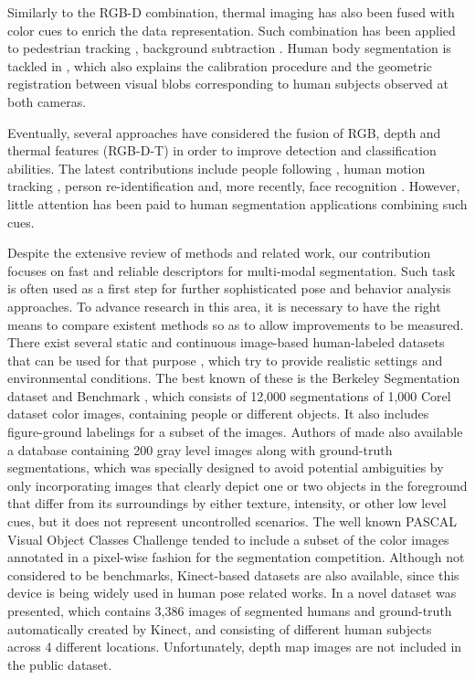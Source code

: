 \documentclass[10pt,twocolumn,letterpaper]{article}
\begin{document}
Similarly to the RGB-D combination, thermal imaging has also been fused with color cues to enrich the data representation. Such combination has been applied to pedestrian tracking \cite{leykin2006robust, leykin2007thermal}, background subtraction \cite{davis2007background}. Human body segmentation is tackled in \cite{zhao2012human}, which also explains the calibration procedure and the geometric registration between visual blobs corresponding to human subjects observed at both cameras. 

Eventually, several approaches have considered the fusion of RGB, depth and thermal features (RGB-D-T) in order to improve detection and classification abilities. The latest contributions include people following \cite{susperregi2013rgb}, human motion tracking \cite{chun2013applications}, person re-identification \cite{mogelmosetri} and, more recently, face recognition \cite{nikisinsrgb}. However, little attention has been paid to human segmentation applications combining such cues.

Despite the extensive review of methods and related work, our contribution focuses on fast and reliable descriptors for multi-modal segmentation. Such task is often used as a first step for further sophisticated pose and behavior analysis approaches. To advance research in this area, it is necessary to have the right means to compare existent methods so as to allow improvements to be measured. There exist several static and continuous image-based human-labeled datasets that can be used for that purpose \cite{moeslund2011visual}, which try to provide realistic settings and environmental conditions. The best known of these is the Berkeley Segmentation dataset and Benchmark \cite{martin2001database}, which consists of 12,000 segmentations of 1,000 Corel dataset color images, containing people or different objects. It also includes figure-ground labelings for a subset of the images. Authors of \cite{alpert2007} made also available a database containing 200 gray level images along with ground-truth segmentations, which was specially designed to avoid potential ambiguities by only incorporating images that clearly depict one or two objects in the foreground that differ from its surroundings by either texture, intensity, or other low level cues, but it does not represent uncontrolled scenarios. The well known PASCAL Visual Object Classes Challenge \cite{everingham2012pascal} tended to include a subset of the color images annotated in a pixel-wise fashion for the segmentation competition. Although not considered to be benchmarks, Kinect-based datasets are also available, since this device is being widely used in human pose related works. In \cite{gulshan2011humanising} a novel dataset was presented, which contains 3,386 images of segmented humans and ground-truth automatically created by Kinect, and consisting of different human subjects across 4 different locations. Unfortunately, depth map images are not included in the public dataset. 
\end{document}
